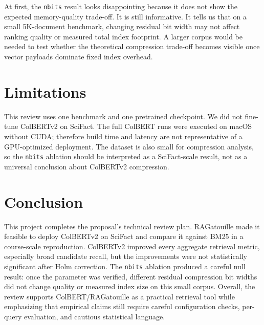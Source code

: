 \documentclass[sigconf,nonacm]{acmart}
\begin{document}
At first, the \texttt{nbits} result looks disappointing because it does not show
the expected memory-quality trade-off. It is still informative. It tells us
that on a small 5K-document benchmark, changing residual bit width may not
affect ranking quality or measured total index footprint. A larger corpus would
be needed to test whether the theoretical compression trade-off becomes visible
once vector payloads dominate fixed index overhead.

\section{Limitations}

This review uses one benchmark and one pretrained checkpoint. We did not
fine-tune ColBERTv2 on SciFact. The full ColBERT runs were executed on macOS
without CUDA; therefore build time and latency are not representative of a
GPU-optimized deployment. The dataset is also small for compression analysis,
so the \texttt{nbits} ablation should be interpreted as a SciFact-scale result,
not as a universal conclusion about ColBERTv2 compression.

\section{Conclusion}

This project completes the proposal's technical review plan. RAGatouille made
it feasible to deploy ColBERTv2 on SciFact and compare it against BM25 in a
course-scale reproduction. ColBERTv2 improved every aggregate retrieval metric,
especially broad candidate recall, but the improvements were not statistically
significant after Holm correction. The \texttt{nbits} ablation produced a
careful null result: once the parameter was verified, different residual
compression bit widths did not change quality or measured index size on this
small corpus. Overall, the review supports ColBERT/RAGatouille as a practical
retrieval tool while emphasizing that empirical claims still require careful
configuration checks, per-query evaluation, and cautious statistical language.
\end{document}
